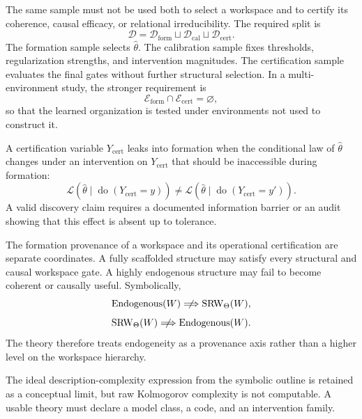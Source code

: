 
The same sample must not be used both to select a workspace and to certify its
coherence, causal efficacy, or relational irreducibility. The required split is
\[
\mathcal D
=
\mathcal D_{\mathrm{form}}
\sqcup
\mathcal D_{\mathrm{cal}}
\sqcup
\mathcal D_{\mathrm{cert}}.
\]
The formation sample selects \(\widehat\theta\). The calibration sample fixes
thresholds, regularization strengths, and intervention magnitudes. The
certification sample evaluates the final gates without further structural
selection. In a multi-environment study, the stronger requirement is
\[
\mathcal E_{\mathrm{form}}
\cap
\mathcal E_{\mathrm{cert}}
=
\varnothing,
\]
so that the learned organization is tested under environments not used to
construct it.

\begin{definition}\label{def:formation-leakage}
A certification variable \(Y_{\mathrm{cert}}\) leaks into formation when the
conditional law of \(\widehat\theta\) changes under an intervention on
\(Y_{\mathrm{cert}}\) that should be inaccessible during formation:
\[
\mathcal L
\left(
\widehat\theta
\mid
\operatorname{do}(Y_{\mathrm{cert}}=y)
\right)
\neq
\mathcal L
\left(
\widehat\theta
\mid
\operatorname{do}(Y_{\mathrm{cert}}=y')
\right).
\]
A valid discovery claim requires a documented information barrier or an audit
showing that this effect is absent up to tolerance.
\end{definition}


The formation provenance of a workspace and its operational certification are
separate coordinates. A fully scaffolded structure may satisfy every
structural and causal workspace gate. A highly endogenous structure may fail
to become coherent or causally useful. Symbolically,
\[
\operatorname{Endogenous}(W)
\centernot\Longrightarrow
\operatorname{SRW}_{\Theta}(W),
\]
\[
\operatorname{SRW}_{\Theta}(W)
\centernot\Longrightarrow
\operatorname{Endogenous}(W).
\]
The theory therefore treats endogeneity as a provenance axis rather than a
higher level on the workspace hierarchy.


The ideal description-complexity expression from the symbolic outline is
retained as a conceptual limit, but raw Kolmogorov complexity is not
computable. A usable theory must declare a model class, a code, and an
intervention family.


